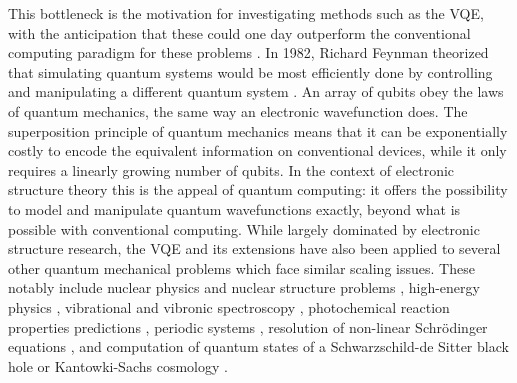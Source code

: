 This bottleneck is the motivation for investigating methods such as the VQE, with the anticipation that these could one day outperform the conventional computing paradigm for these problems \cite{Boixo2018, mccaskeyQuantumChemistryBenchmark2019}. In 1982, Richard Feynman theorized that simulating quantum systems would be most efficiently done by controlling and manipulating a different quantum system \cite{Feynman1982}. An array of qubits obey the laws of quantum mechanics, the same way an electronic wavefunction does. The superposition principle \cite{Silverman2008, Ballentine2008} of quantum mechanics means that it can be exponentially costly to encode the equivalent information on conventional devices, while it only requires a linearly growing number of qubits. In the context of electronic structure theory \cite{Helgaker2000, Kratzer2019, Li2020_EST} this is the appeal of quantum computing: it offers the possibility to model and manipulate quantum wavefunctions exactly, beyond what is possible with conventional computing. While largely dominated by electronic structure research, the VQE and its extensions have also been applied to several other quantum mechanical problems which face similar scaling issues. These notably include nuclear physics \cite{Miceli2019, DiMatteo2021} and nuclear structure problems \cite{Kiss2022, Romero2022}, high-energy physics \cite{Bauls2020, Bass2021, Bauer2022}, vibrational and vibronic spectroscopy \cite{McArdle2019_vibra, Sawaya2019, Ollitrault2020_vibrational, Jahangiri2020,Ltstedt2021, Sawaya2021}, photochemical reaction properties predictions \cite{Mitarai2020, Omiya2022}, periodic systems \cite{Liu2020, Yoshioka2022, Manrique2020}, resolution of non-linear Schr{\"{o}}dinger equations \cite{Lubasch2020}, and computation of quantum states of a Schwarzschild-de Sitter black hole or Kantowki-Sachs cosmology \cite{Joseph2022}.

